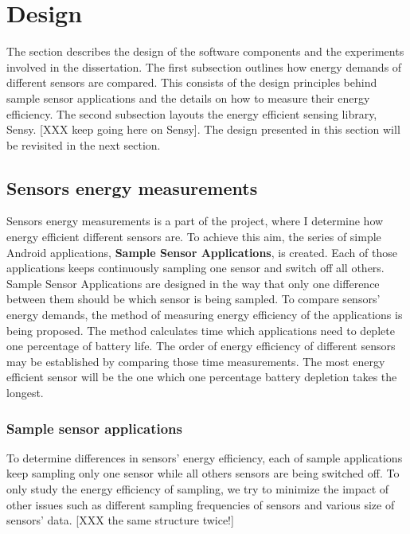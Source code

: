 \section{Design}
\label{s:design}
\hspace{10pt} The section describes the design of the software components and the experiments involved in the dissertation. The first subsection outlines how energy demands of different sensors are compared. This consists of the design principles behind sample sensor applications and the details on how to measure their energy efficiency. The second subsection layouts the energy efficient sensing library, Sensy. [XXX keep going here on Sensy]. The design presented in this section will be revisited in the next section.

\subsection{Sensors energy measurements}
\label{s:design:measurements}
\hspace{10pt} Sensors energy measurements is a part of the project, where I determine how energy efficient different sensors are. To achieve this aim, the series of simple Android applications, \textbf{Sample Sensor Applications},  is created. Each of those applications keeps continuously sampling one sensor and switch off all others. Sample Sensor Applications are designed in the way that only one difference between them should be which sensor is being sampled. To compare sensors' energy demands, the method of measuring energy efficiency of the applications is being proposed. The method calculates time which applications need to deplete one percentage of battery life. The order of energy efficiency of different sensors may be established by comparing those time measurements. The most energy efficient sensor will be the one which one percentage battery depletion takes the longest. 

\subsubsection{Sample sensor applications}
\label{s:design:measurements:sampleapps}
\hspace{10pt} To determine differences in sensors' energy efficiency, each of sample applications keep sampling only one sensor while all others sensors are being switched off. To only study the energy efficiency of sampling, we try to minimize the impact of other issues such as different sampling frequencies of sensors and various size of sensors' data. [XXX the same structure twice!]

